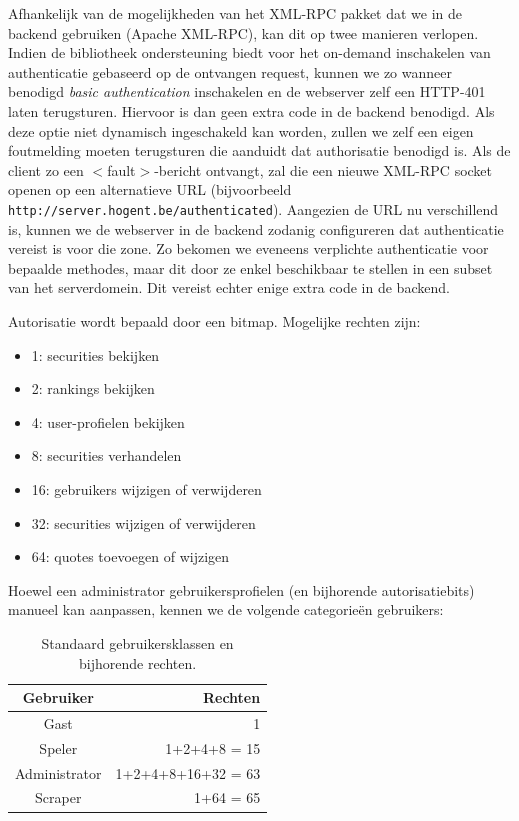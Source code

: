 Afhankelijk van de mogelijkheden van het XML-RPC pakket dat we in de backend gebruiken (Apache XML-RPC), kan dit op twee manieren verlopen. Indien de bibliotheek ondersteuning biedt voor het on-demand inschakelen van authenticatie gebaseerd op de ontvangen request, kunnen we zo wanneer benodigd \emph{basic authentication} inschakelen en de webserver zelf een HTTP-401 laten terugsturen. Hiervoor is dan geen extra code in de backend benodigd.
Als deze optie niet dynamisch ingeschakeld kan worden, zullen we zelf een eigen foutmelding moeten terugsturen die aanduidt dat authorisatie benodigd is. Als de client zo een $<$fault$>$-bericht ontvangt, zal die een nieuwe XML-RPC socket openen op een alternatieve URL (bijvoorbeeld \texttt{http://server.hogent.be/authenticated}). Aangezien de URL nu verschillend is, kunnen we de webserver in de backend zodanig configureren dat authenticatie vereist is voor die zone. Zo bekomen we eveneens verplichte authenticatie voor bepaalde methodes, maar dit door ze enkel beschikbaar te stellen in een subset van het serverdomein. Dit vereist echter enige extra code in de backend.

Autorisatie wordt bepaald door een bitmap. Mogelijke rechten zijn:
\begin{itemize}
\item{1: securities bekijken}
\item{2: rankings bekijken}
\item{4: user-profielen bekijken}
\item{8: securities verhandelen}
\item{16: gebruikers wijzigen of verwijderen}
\item{32: securities wijzigen of verwijderen}
\item{64: quotes toevoegen of wijzigen}
\end{itemize}

Hoewel een administrator gebruikersprofielen (en bijhorende autorisatiebits) manueel kan aanpassen, kennen we de volgende categorieën gebruikers:
\begin{table}
\begin{center}
\begin{tabular}{| c | r |}
	\hline
	\textbf{Gebruiker} & \textbf{Rechten} \\
	\hline
	Gast & 1 \\
	Speler & 1+2+4+8 = 15 \\
	Administrator & 1+2+4+8+16+32 = 63 \\
	Scraper & 1+64 = 65 \\
	\hline
\end{tabular}
\caption{Standaard gebruikersklassen en bijhorende rechten.}
\end{center}
\end{table}

